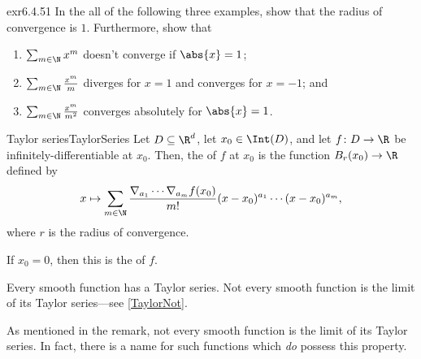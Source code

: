 \begin{exr}{}{exr6.4.51}
In the all of the following three examples, show that the radius of convergence is $1$.  Furthermore, show that
\begin{enumerate}
\item $\sum _{m\in \N}x^m$ doesn't converge if $\abs{x}=1$;
\item $\sum _{m\in \N}\frac{x^m}{m}$ diverges for $x=1$ and converges for $x=-1$; and
\item $\sum _{m\in \N}\frac{x^m}{m^2}$ converges absolutely for $\abs{x}=1$.
\end{enumerate}
\end{exr}
\begin{dfn}{Taylor series}{TaylorSeries}
Let $D\subseteq \R ^d$, let $x_0\in \Int (D)$, and let $f\colon D\rightarrow \R$ be infinitely-differentiable at $x_0$.  Then, the  of $f$ at $x_0$ is the function $B_r(x_0)\rightarrow \R$ defined by
{\small
\begin{equation}\label{Taylor}
x\mapsto \sum _{m\in \N}\frac{\nabla _{a_1}\cdots \nabla _{a_m}f(x_0)}{m!}(x-x_0)^{a_1}\cdots (x-x_0)^{a_m},
\end{equation}
}
where $r$ is the radius of convergence.
\begin{rmk}
If $x_0=0$, then this is the  of $f$.
\end{rmk}
\begin{rmk}
Every smooth function has a Taylor series.  Not every smooth function is the limit of its Taylor series---see \cref{TaylorNot}.
\end{rmk}
\end{dfn}
As mentioned in the remark, not every smooth function is the limit of its Taylor series.  In fact, there is a name for such functions which \emph{do} possess this property.
